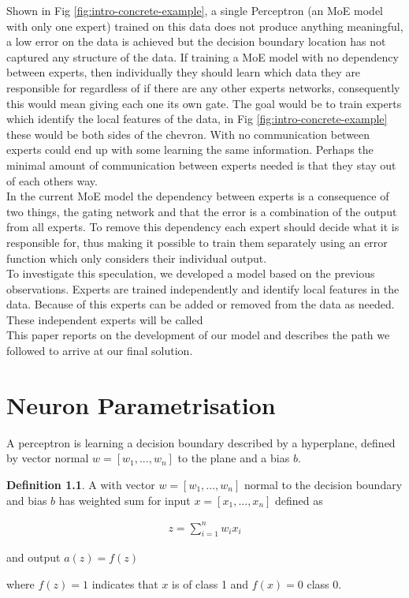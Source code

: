 \documentclass[notitlepage]{report}
\theoremstyle{definition}
\newtheorem{definition}{Definition}[section]
\begin{document}
Shown in Fig \ref{fig:intro-concrete-example}, a single Perceptron (an MoE model with only one expert) trained on this data does not produce anything meaningful, a low error on the data is achieved but the decision boundary location has not captured any structure of the data. If training a MoE model with no dependency between experts, then individually they should learn which data they are responsible for regardless of if there are any other experts networks, consequently this would mean giving each one its own gate. The goal would be to train experts which identify the local features of the data, in Fig \ref{fig:intro-concrete-example} these would be both sides of the chevron. With no communication between experts  could end up with some learning the same information. Perhaps the minimal amount of communication between experts needed is that they stay out of each others way.\\

In the current MoE model the dependency between experts is a consequence of two things, the gating network and that the error is a combination of the output from all experts. To remove this dependency each expert should decide what it is responsible for, thus making it possible to train them separately using an error function which only considers their individual output. \\

To investigate this speculation, we developed a model based on the previous observations. Experts are trained independently and identify local features in the data. Because of this experts can be added or removed from the data as needed. These independent experts will be called \\

This paper reports on the development of our model and describes the path we followed to arrive at our final solution.

\chapter{Neuron Parametrisation}
A perceptron is learning a decision boundary described by a hyperplane, defined by vector normal $w = [w_1, ..., w_n]$ to the plane and a bias $b$.

\theoremstyle{definition}
\begin{definition}
	A  with vector $w = [w_1, ..., w_n]$ normal to the decision boundary and bias $b$ has weighted sum for input $x = [x_1, ..., x_n]$ defined as
	
	\begin{align*}
		z = \sum_{i=1}^{n} w_i x_i
	\end{align*}
	
	and output $a(z) = f(z)$
	
	where $f(z) = 1$ indicates that $x$ is of class 1 and $f(x) = 0$ class 0.
\end{definition}
\end{document}
